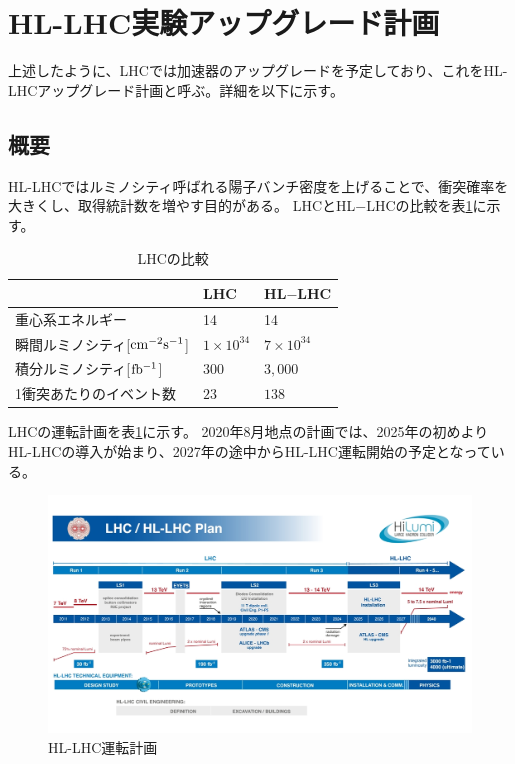 \clearpage
\section{HL-LHC実験アップグレード計画}
上述したように、LHCでは加速器のアップグレードを予定しており、これをHL-LHCアップグレード計画と呼ぶ。詳細を以下に示す。
\subsection{概要}
HL-LHCではルミノシティ呼ばれる陽子バンチ密度を上げることで、衝突確率を大きくし、取得統計数を増やす目的がある。
LHCとHL$-$LHCの比較を表\ref{compare_lhc}に示す。

\begin{table}[tbp]
\begin{center}
\caption[LHCの比較]{LHCの比較\cite{1-6}}
\label{compare_lhc}
  \begin{tabular}{|lll|} \hline
    & LHC & HL$-$LHC \\ \hline
    重心系エネルギー & 14 & 14 \\
    瞬間ルミノシティ[$\rm{cm^{-2}s^{-1}}$] & $1\times 10^{34}$ & $7\times10^{34}$ \\
    積分ルミノシティ[$\rm{fb^{-1}}$] & $300$ & $3,000$ \\
    1衝突あたりのイベント数 & $23$ & $138$ \\ \hline 
  \end{tabular}
\end{center}
\end{table}

LHCの運転計画を表\ref{hllhc_plan}に示す。
2020年8月地点の計画では、2025年の初めよりHL-LHCの導入が始まり、2027年の途中からHL-LHC運転開始の予定となっている。
\begin{figure}[bpt]\centering
\includegraphics[width=12cm]{hllhc_plan}
\caption[HL-LHC運転計画]{HL-LHC運転計画\cite{1-7}}
\label{hllhc_plan}
\end{figure}

